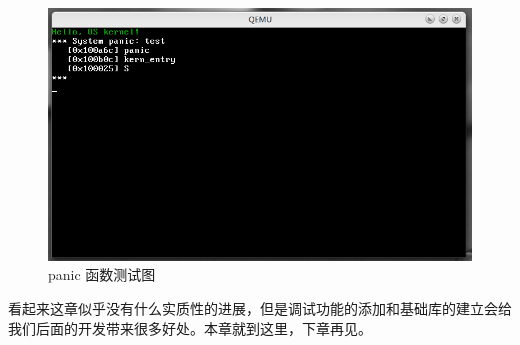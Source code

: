 \begin{figure}[H]
      \centering
      \includegraphics[scale=0.4]{picture/chapt5/os_panic.png}
      \caption{panic 函数测试图}
\end{figure}

\par 看起来这章似乎没有什么实质性的进展，但是调试功能的添加和基础库的建立会给我们后面的开发带来很多好处。本章就到这里，下章再见。
